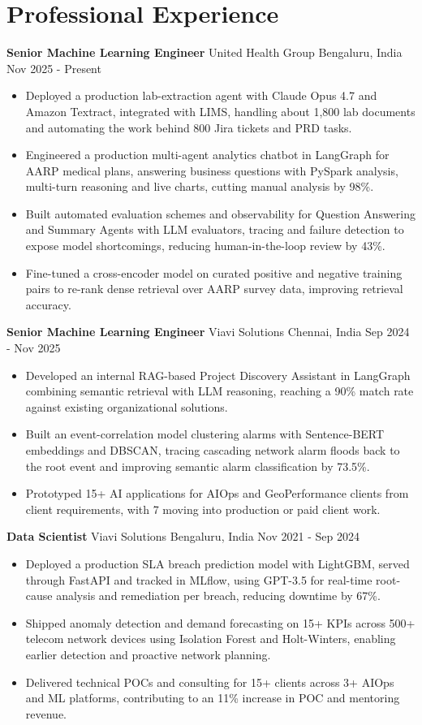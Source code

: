 \documentclass[10pt,a4paper]{article}
\newcommand{\role}[4]{\textbf{#1} \textbar{} #2 \hfill #3 \textbar{} #4\par}
\begin{document}
\section{Professional Experience}
\role{Senior Machine Learning Engineer}{United Health Group}{Bengaluru, India}{Nov 2025 - Present}
\begin{itemize}
  \item Deployed a production lab-extraction agent with Claude Opus 4.7 and Amazon Textract, integrated with LIMS, handling about 1,800 lab documents and automating the work behind 800 Jira tickets and PRD tasks.
  \item Engineered a production multi-agent analytics chatbot in LangGraph for AARP medical plans, answering business questions with PySpark analysis, multi-turn reasoning and live charts, cutting manual analysis by 98\%.
  \item Built automated evaluation schemes and observability for Question Answering and Summary Agents with LLM evaluators, tracing and failure detection to expose model shortcomings, reducing human-in-the-loop review by 43\%.
  \item Fine-tuned a cross-encoder model on curated positive and negative training pairs to re-rank dense retrieval over AARP survey data, improving retrieval accuracy.
\end{itemize}
\vspace{3pt}
\role{Senior Machine Learning Engineer}{Viavi Solutions}{Chennai, India}{Sep 2024 - Nov 2025}
\begin{itemize}
  \item Developed an internal RAG-based Project Discovery Assistant in LangGraph combining semantic retrieval with LLM reasoning, reaching a 90\% match rate against existing organizational solutions.
  \item Built an event-correlation model clustering alarms with Sentence-BERT embeddings and DBSCAN, tracing cascading network alarm floods back to the root event and improving semantic alarm classification by 73.5\%.
  \item Prototyped 15+ AI applications for AIOps and GeoPerformance clients from client requirements, with 7 moving into production or paid client work.
\end{itemize}
\vspace{3pt}
\role{Data Scientist}{Viavi Solutions}{Bengaluru, India}{Nov 2021 - Sep 2024}
\begin{itemize}
  \item Deployed a production SLA breach prediction model with LightGBM, served through FastAPI and tracked in MLflow, using GPT-3.5 for real-time root-cause analysis and remediation per breach, reducing downtime by 67\%.
  \item Shipped anomaly detection and demand forecasting on 15+ KPIs across 500+ telecom network devices using Isolation Forest and Holt-Winters, enabling earlier detection and proactive network planning.
  \item Delivered technical POCs and consulting for 15+ clients across 3+ AIOps and ML platforms, contributing to an 11\% increase in POC and mentoring revenue.
\end{itemize}
\end{document}
